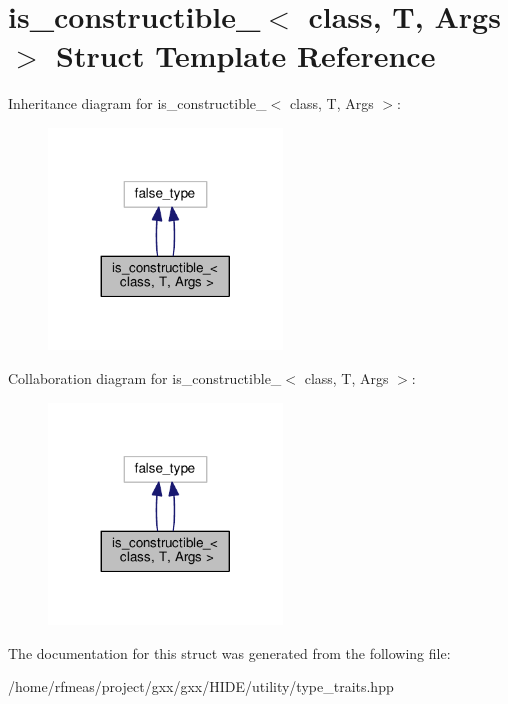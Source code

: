\hypertarget{structis__constructible__}{}\section{is\+\_\+constructible\+\_\+$<$ class, T, Args $>$ Struct Template Reference}
\label{structis__constructible__}


Inheritance diagram for is\+\_\+constructible\+\_\+$<$ class, T, Args $>$\+:
\nopagebreak
\begin{figure}[H]
\begin{center}
\leavevmode
\includegraphics[width=176pt]{structis__constructible____inherit__graph}
\end{center}
\end{figure}


Collaboration diagram for is\+\_\+constructible\+\_\+$<$ class, T, Args $>$\+:
\nopagebreak
\begin{figure}[H]
\begin{center}
\leavevmode
\includegraphics[width=176pt]{structis__constructible____coll__graph}
\end{center}
\end{figure}


The documentation for this struct was generated from the following file\+:\begin{DoxyCompactItemize}
\item 
/home/rfmeas/project/gxx/gxx/\+H\+I\+D\+E/utility/type\+\_\+traits.\+hpp\end{DoxyCompactItemize}
